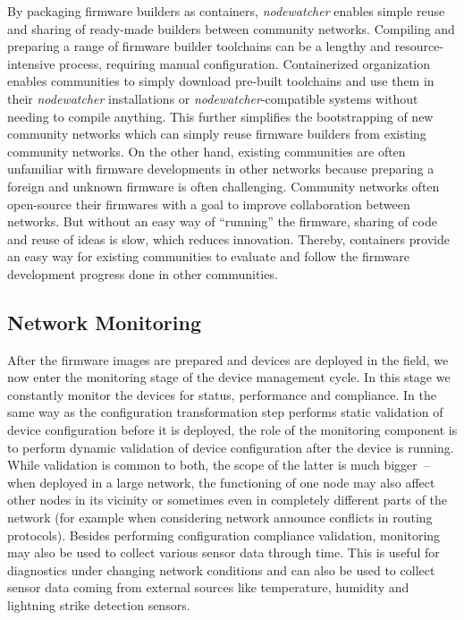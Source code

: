 \documentclass[5p,sort&compress]{elsarticle}
\newcommand{\nodewatcher}{\textit{nodewatcher}}
\begin{document}
By packaging firmware builders as containers, \nodewatcher{} enables simple reuse and sharing of ready-made builders between community networks.
Compiling and preparing a range of firmware builder toolchains can be a lengthy and resource-intensive process, requiring manual configuration.
Containerized organization enables communities to simply download pre-built toolchains and use them in their \nodewatcher{} installations or \nodewatcher{}-compatible systems without needing to compile anything.
This further simplifies the bootstrapping of new community networks which can simply reuse firmware builders from existing community networks.
On the other hand, existing communities are often unfamiliar with firmware developments in other networks because preparing a foreign and unknown firmware is often challenging.
Community networks often open-source their firmwares with a goal to improve collaboration between networks.
But without an easy way of ``running'' the firmware, sharing of code and reuse of ideas is slow, which reduces innovation.
Thereby, containers provide an easy way for existing communities to evaluate and follow the firmware development progress done in other communities.

\subsection{Network Monitoring}
\label{sec:network-monitoring}

After the firmware images are prepared and devices are deployed in the field, we now enter the monitoring stage of the device management cycle.
In this stage we constantly monitor the devices for status, performance and compliance.
In the same way as the configuration transformation step performs static validation of device configuration before it is deployed, the role of the monitoring component is to perform dynamic validation of device configuration after the device is running.
While validation is common to both, the scope of the latter is much bigger~-- when deployed in a large network, the functioning of one node may also affect other nodes in its vicinity or sometimes even in completely different parts of the network (for example when considering network announce conflicts in routing protocols).
Besides performing configuration compliance validation, monitoring may also be used to collect various sensor data through time.
This is useful for diagnostics under changing network conditions and can also be used to collect sensor data coming from external sources like temperature, humidity and lightning strike detection sensors.
\end{document}
